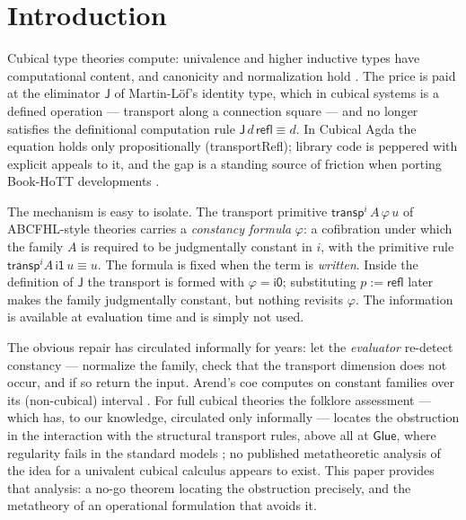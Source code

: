\documentclass{lmcs}
\newcommand{\transp}{\mathsf{transp}}
\newcommand{\refl}{\mathsf{refl}}
\newcommand{\J}{\mathsf{J}}
\newcommand{\Glue}{\mathsf{Glue}}
\renewcommand{\conv}{\equiv}
\newcommand{\ii}{\mathsf{i1}}
\newcommand{\io}{\mathsf{i0}}
\begin{document}
\section{Introduction}
\label{sec:intro}

Cubical type theories \cite{CCHM,ABCFHL} compute: univalence and
higher inductive types have computational content, and canonicity and
normalization hold \cite{HuberNorm,SterlingAngiuli}.  The price is
paid at the eliminator $\J$ of Martin-L\"of's identity type, which in
cubical systems is a defined operation --- transport along a
connection square --- and no longer satisfies the definitional
computation rule $\J\,d\,\refl \conv d$.  In Cubical Agda
\cite{VezzosiMortbergAbel} the equation holds only propositionally
(\textsf{transportRefl}); library code is peppered with explicit
appeals to it, and the gap is a standing source of friction when
porting Book-HoTT developments \cite{UIPCubical}.

The mechanism is easy to isolate.  The transport primitive
$\transp^i\,A\,\varphi\,u$ of ABCFHL-style theories carries a
\emph{constancy formula} $\varphi$: a cofibration under which the
family $A$ is required to be judgmentally constant in $i$, with the
primitive rule $\transp^i A\,\ii\,u \conv u$.  The formula is fixed
when the term is \emph{written}.  Inside the definition of $\J$ the
transport is formed with $\varphi = \io$; substituting $p := \refl$
later makes the family judgmentally constant, but nothing revisits
$\varphi$.  The information is available at evaluation time and is
simply not used.

The obvious repair has circulated informally for years: let the
\emph{evaluator} re-detect constancy --- normalize the family, check
that the transport dimension does not occur, and if so return the
input.  Arend's \textsf{coe} computes on constant families over its
(non-cubical) interval \cite{Arend}.  For full cubical theories the
folklore assessment --- which has, to our knowledge, circulated only
informally --- locates the obstruction in the interaction with the
structural transport rules, above all at $\Glue$, where regularity
fails in the standard models \cite{SwanRegularity,SattlerNote}; no
published metatheoretic analysis of the idea for a univalent cubical
calculus appears to exist.
This paper provides that analysis: a no-go theorem locating the
obstruction precisely, and the metatheory of an operational
formulation that avoids it.
\end{document}
